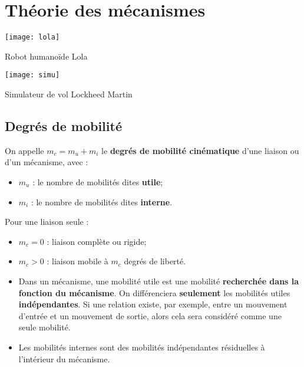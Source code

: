 \setchapterpreamble[u]{\margintoc}

\chapter{Théorie des mécanismes}




\begin{marginfigure}[4cm]
\centering
\texttt{[image: lola]}
\caption{Robot humanoïde Lola}
\end{marginfigure}

\begin{marginfigure}[8cm]
\centering
\texttt{[image: simu]}
\caption{Simulateur de vol Lockheed Martin}
\end{marginfigure}

\section{Degrés de mobilité}

	
\begin{defi}
On appelle $m_c=m_u+m_i$ le \textbf{degrés de mobilité cinématique} d'une liaison ou d'un mécanisme, avec :
\begin{itemize}
\item $m_u$ : le nombre de mobilités dites \textbf{utile};
\item $m_i$ : le nombre de mobilités dites \textbf{interne}.
\end{itemize}
\end{defi}

Pour une liaison seule :
\begin{itemize}
\item $m_c=0$ : liaison complète ou rigide;
\item $m_c>0$ : liaison mobile à $m_c$ degrés de liberté.
\end{itemize}

\begin{remarque}
\begin{itemize}
\item Dans un mécanisme, une mobilité utile est une mobilité \textbf{recherchée dans la fonction du mécanisme}.
On différenciera \textbf{seulement} les mobilités utiles \textbf{indépendantes}.
Si une relation existe, par exemple, entre un mouvement d'entrée et un mouvement de sortie, alors cela sera considéré comme une seule mobilité.
\item Les mobilités internes sont des mobilités indépendantes résiduelles à l'intérieur du mécanisme.
\end{itemize}
\end{remarque}


